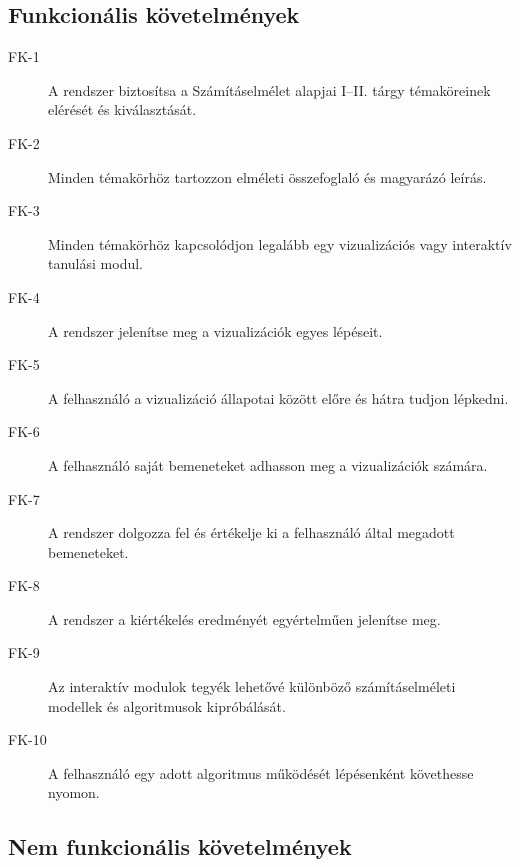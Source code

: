 \documentclass[12pt,a4paper]{report}
\begin{document}
\subsection{Funkcionális követelmények}

\begin{description}
    \item[FK-1] A rendszer biztosítsa a Számításelmélet alapjai I--II.
          tárgy témaköreinek elérését és kiválasztását.
    \item[FK-2] Minden témakörhöz tartozzon elméleti összefoglaló és
          magyarázó leírás.
    \item[FK-3] Minden témakörhöz kapcsolódjon legalább egy vizualizációs
          vagy interaktív tanulási modul.
    \item[FK-4] A rendszer jelenítse meg a vizualizációk egyes lépéseit.
    \item[FK-5] A felhasználó a vizualizáció állapotai között előre és
          hátra tudjon lépkedni.
    \item[FK-6] A felhasználó saját bemeneteket adhasson meg a
          vizualizációk számára.
    \item[FK-7] A rendszer dolgozza fel és értékelje ki a felhasználó
          által megadott bemeneteket.
    \item[FK-8] A rendszer a kiértékelés eredményét egyértelműen
          jelenítse meg.
    \item[FK-9] Az interaktív modulok tegyék lehetővé különböző
          számításelméleti modellek és algoritmusok kipróbálását.
    \item[FK-10] A felhasználó egy adott algoritmus működését lépésenként
          követhesse nyomon.
\end{description}

\subsection{Nem funkcionális követelmények}
\end{document}
